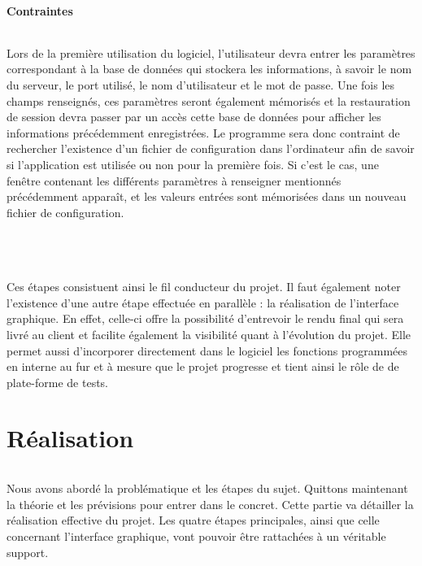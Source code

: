 \documentclass[a4paper,10pt]{report}
\begin{document}
      \subsection{Contraintes}
	\paragraph{}
      Lors de la première utilisation du logiciel, l'utilisateur devra entrer les paramètres correspondant à la base de données qui stockera les informations, à savoir le nom du serveur, le port utilisé, le nom d'utilisateur et le mot de passe.
      Une fois les champs renseignés, ces paramètres seront également mémorisés et la restauration de session devra passer par un accès cette base de données pour afficher les informations précédemment enregistrées.
      Le programme sera donc contraint de rechercher l'existence d'un fichier de configuration dans l'ordinateur afin de savoir si l'application est utilisée ou non pour la première fois.
      Si c'est le cas, une fenêtre contenant les différents paramètres à renseigner mentionnés précédemment apparaît, et les valeurs entrées sont mémorisées dans un nouveau fichier de configuration.
      ~\\
      ~\\
      ~\\
	\paragraph{}
	  Ces étapes consistuent ainsi le fil conducteur du projet. 
	  Il faut également noter l'existence d'une autre étape effectuée en parallèle : la réalisation de l'interface graphique.
	  En effet, celle-ci offre la possibilité d'entrevoir le rendu final qui sera livré au client et facilite également la visibilité quant à l'évolution du projet.
	  Elle permet aussi d'incorporer directement dans le logiciel les fonctions programmées en interne au fur et à mesure que le projet progresse et tient ainsi le rôle de de plate-forme de tests.   
	
\part{Réalisation}
  \setcounter{chapter}{0}
  
  \paragraph{}
    Nous avons abordé la problématique et les étapes du sujet.
    Quittons maintenant la théorie et les prévisions pour entrer dans le concret.
    Cette partie va détailler la réalisation effective du projet.
    Les quatre étapes principales, ainsi que celle concernant l'interface graphique, vont pouvoir être rattachées à un véritable support.
    
\end{document}
